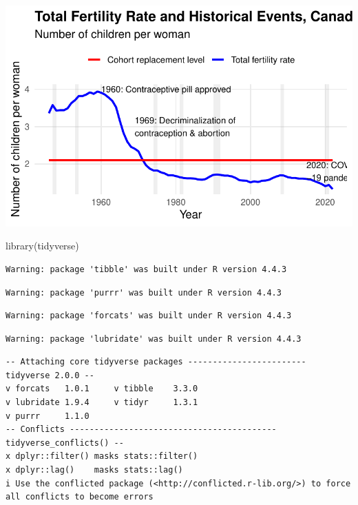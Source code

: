 \documentclass[
  letterpaper,
  DIV=11,
  numbers=noendperiod]{scrartcl}
\newenvironment{Shaded}{\begin{snugshade}}{\end{snugshade}}
\newcommand{\FunctionTok}[1]{\textcolor[rgb]{0.28,0.35,0.67}{#1}}
\newcommand{\NormalTok}[1]{\textcolor[rgb]{0.00,0.23,0.31}{#1}}
\begin{document}
\includegraphics{paper_files/figure-pdf/unnamed-chunk-4-1.pdf}

\begin{Shaded}
\begin{Highlighting}[]
\FunctionTok{library}\NormalTok{(tidyverse)}
\end{Highlighting}
\end{Shaded}

\begin{verbatim}
Warning: package 'tibble' was built under R version 4.4.3
\end{verbatim}

\begin{verbatim}
Warning: package 'purrr' was built under R version 4.4.3
\end{verbatim}

\begin{verbatim}
Warning: package 'forcats' was built under R version 4.4.3
\end{verbatim}

\begin{verbatim}
Warning: package 'lubridate' was built under R version 4.4.3
\end{verbatim}

\begin{verbatim}
-- Attaching core tidyverse packages ------------------------ tidyverse 2.0.0 --
v forcats   1.0.1     v tibble    3.3.0
v lubridate 1.9.4     v tidyr     1.3.1
v purrr     1.1.0     
-- Conflicts ------------------------------------------ tidyverse_conflicts() --
x dplyr::filter() masks stats::filter()
x dplyr::lag()    masks stats::lag()
i Use the conflicted package (<http://conflicted.r-lib.org/>) to force all conflicts to become errors
\end{verbatim}
\end{document}
